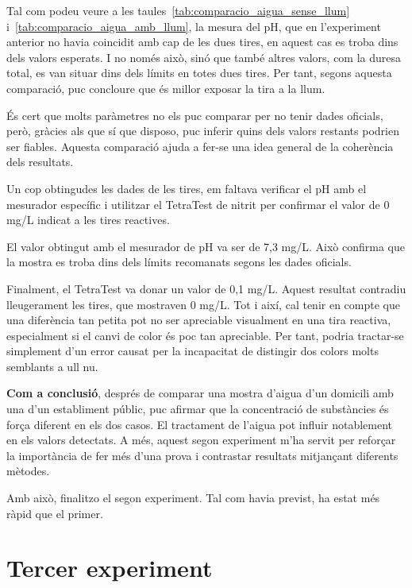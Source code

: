 Tal com podeu veure a les taules~\ref{tab:comparacio_aigua_sense_llum} i~\ref{tab:comparacio_aigua_amb_llum}, la mesura del pH, que en l’experiment anterior no havia coincidit amb cap de les dues tires, en aquest cas es troba dins dels valors esperats. I no només això, sinó que també altres valors, com la duresa total, es van situar dins dels límits en totes dues tires. Per tant, segons aquesta comparació, puc concloure que és millor exposar la tira a la llum.

És cert que molts paràmetres no els puc comparar per no tenir dades oficials, però, gràcies als que sí que disposo, puc inferir quins dels valors restants podrien ser fiables. Aquesta comparació ajuda a fer-se una idea general de la coherència dels resultats.

Un cop obtingudes les dades de les tires, em faltava verificar el pH amb el mesurador específic i utilitzar el TetraTest de nitrit per confirmar el valor de 0 mg/L indicat a les tires reactives.

El valor obtingut amb el mesurador de pH va ser de 7,3 mg/L. Això confirma que la mostra es troba dins dels límits recomanats segons les dades oficials.

Finalment, el TetraTest va donar un valor de 0,1 mg/L. Aquest resultat contradiu lleugerament les tires, que mostraven 0 mg/L. Tot i així, cal tenir en compte que una diferència tan petita pot no ser apreciable visualment en una tira reactiva, especialment si el canvi de color és poc tan apreciable. Per tant, podria tractar-se simplement d’un error causat per la incapacitat de distingir dos colors molts semblants a ull nu.

\bigskip


\textbf{Com a conclusió}, després de comparar una mostra d’aigua d’un domicili amb una d’un establiment públic, puc afirmar que la concentració de substàncies és força diferent en els dos casos. El tractament de l’aigua pot influir notablement en els valors detectats. A més, aquest segon experiment m’ha servit per reforçar la importància de fer més d’una prova i contrastar resultats mitjançant diferents mètodes.

Amb això, finalitzo el segon experiment. Tal com havia previst, ha estat més ràpid que el primer.%
\clearpage

\section{Tercer experiment}


